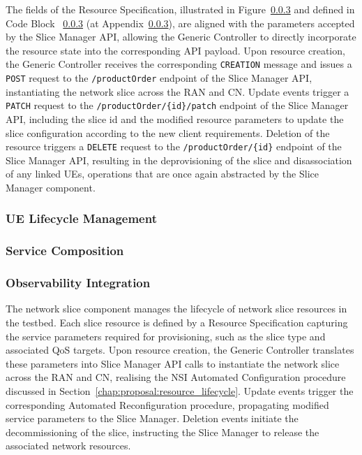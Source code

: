 The fields of the Resource Specification, illustrated in Figure~\ref{} and defined in Code Block ~\ref{} (at Appendix~\ref{}), are aligned with the parameters accepted by the Slice Manager \acs{API}, allowing the Generic Controller to directly incorporate the resource state into the corresponding \acs{API} payload. Upon resource creation, the Generic Controller receives the  corresponding \texttt{CREATION} message and issues a \texttt{POST} request to the \texttt{/productOrder} endpoint of the Slice Manager \acs{API}, instantiating the network slice across the \acs{RAN} and \acs{CN}. Update events trigger a \texttt{PATCH} request to the \texttt{/productOrder/\{id\}/patch} endpoint of the Slice Manager \acs{API}, including the slice id and the modified resource parameters to update the slice configuration according to the new client requirements. Deletion of the resource triggers a \texttt{DELETE} request to the \texttt{/productOrder/\{id\}} endpoint of the Slice Manager \acs{API}, resulting in the deprovisioning of the slice and disassociation of any linked \acsp{UE}, operations that are once again abstracted by the Slice Manager component.

\subsubsection{\acl{UE} Lifecycle Management}


\subsubsection{Service Composition}

\subsubsection{Observability Integration}

The network slice component manages the lifecycle of network slice resources in the testbed. Each slice resource is defined by a Resource Specification capturing the service parameters required for provisioning, such as the slice type and associated \acs{QoS} targets. Upon resource creation, the Generic Controller translates these parameters into Slice Manager \acs{API} calls to instantiate the network slice across the \acs{RAN} and \acs{CN}, realising the \acs{NSI} Automated Configuration procedure discussed in Section~\ref{chap:proposal:resource_lifecycle}. Update events trigger the corresponding Automated Reconfiguration procedure, propagating modified service parameters to the Slice Manager. Deletion events initiate the decommissioning of the slice, instructing the Slice Manager to release the associated network resources.

